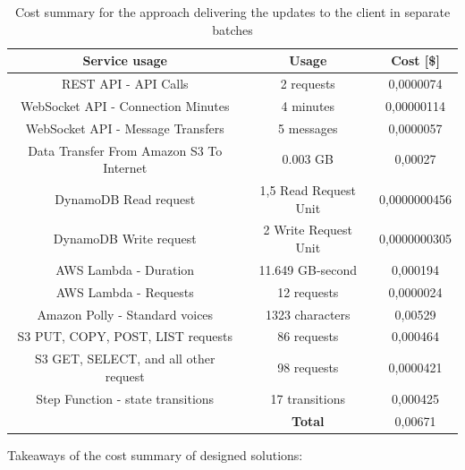 \begin{table}[H]
    \centering
    \begin{tabular}{ |c|c|c| } 
    \hline
    Service usage & Usage & Cost [\$] \\
    \hline
    REST API - API Calls & 2 requests & 0,0000074 \\
    WebSocket API - Connection Minutes & 4 minutes & 0,00000114 \\
    WebSocket API - Message Transfers & 5 messages & 0,0000057 \\
    \hline
    Data Transfer From Amazon S3 To Internet & 0.003 GB & 0,00027 \\
    \hline
    DynamoDB Read request & 1,5 Read Request Unit & 0,0000000456 \\
    DynamoDB Write request & 2 Write Request Unit & 0,0000000305 \\
    \hline
    AWS Lambda - Duration & 11.649 GB-second & 0,000194 \\
    AWS Lambda - Requests & 12 requests & 0,0000024 \\
    \hline
    Amazon Polly - Standard voices & 1323 characters & 0,00529 \\
    \hline
    S3 PUT, COPY, POST, LIST requests & 86 requests & 0,000464 \\
    S3 GET, SELECT, and all other request & 98 requests & 0,0000421 \\
    \hline
    Step Function - state transitions & 17 transitions & 0,000425 \\
    \hline
    \multicolumn{1}{c|}{} & \textbf{Total} & 0,00671 \\
    \cline{2-3}
    \end{tabular}
    \caption{Cost summary for the approach delivering the updates to the client in separate batches}
    \label{table:case-study-service-initial-batch-spending-summary}
\end{table}

Takeaways of the cost summary of designed solutions:

